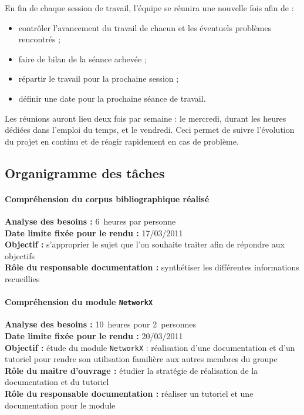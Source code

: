 \medskip
En fin de chaque session de travail, l'équipe se réunira une nouvelle fois afin de :
\begin{itemize}
  \item contrôler l'avancement du travail de chacun et les éventuels problèmes rencontrés ;
  \item faire de bilan de la séance achevée ;
  \item répartir le travail pour la prochaine session ;
  \item définir une date pour la prochaine séance de travail.
\end{itemize}

Les réunions auront lieu deux fois par semaine : le mercredi, durant les heures dédiées dans l'emploi du temps, et le vendredi. Ceci permet de suivre l'évolution du projet en continu et de réagir rapidement en cas de problème.


\subsection{Organigramme des tâches}
\paragraph*{Compréhension du corpus bibliographique réalisé\\}
\textbf{Analyse des besoins :} 6~heures par personne\\
\textbf{Date limite fixée pour le rendu :} 17/03/2011\\
\textbf{Objectif : }s'approprier le sujet que l'on souhaite traiter afin de répondre aux objectifs\\
\textbf{Rôle du responsable documentation :} synthétiser les différentes informations recueillies

\paragraph*{Compréhension du module \verb?NetworkX?\\}
\textbf{Analyse des besoins :} 10~heures pour 2~personnes\\
\textbf{Date limite fixée pour le rendu :} 20/03/2011\\
\textbf{Objectif :} étude du module \verb?NetworkX? : réalisation d'une documentation et d'un tutoriel pour rendre son utilisation familière aux autres membres du groupe\\
\textbf{Rôle du maitre d'ouvrage : }étudier la stratégie de réalisation de la documentation et du tutoriel\\
\textbf{Rôle du responsable documentation : }réaliser un tutoriel et une documentation pour le module

